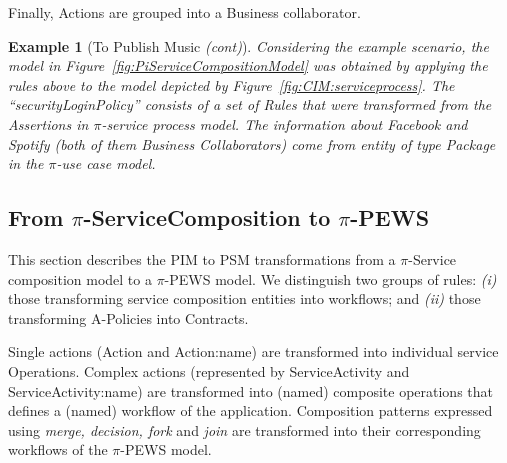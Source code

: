 \documentclass[12pt,twoside]{article}
\theoremstyle{plain}
\theoremstyle{plain}
\newtheorem{example}{Example}
\begin{document}
\begin{multicols}{2}
Finally, {\sf Actions} are grouped into  a {\sf Business collaborator}.



\begin{example}[To Publish Music \textit{(cont)}]\label{ex:toPublicMusicT5}
Considering the example scenario, the model in Figure~\ref{fig:PiServiceCompositionModel} was obtained by applying the rules above to the model depicted by Figure~\ref{fig:CIM:serviceprocess}.  
The ``securityLoginPolicy'' consists of a set of {\sf Rules} that were transformed from the {\sf Assertions} in $\pi$-service process model. 
The information about Facebook and Spotify (both of them {\sf Business
Collaborators}) come from entity of type {\sc Package} in the $\pi$-use case
model.
\end{example}

\subsection{From $\pi$-ServiceComposition to $\pi$-PEWS}

This section describes the PIM to PSM transformations from a $\pi$-Service composition mod\-el to a $\pi$-PEWS model. 
We distinguish two groups of rules: \textit{(i)} those transforming service composition entities into workflows; and \textit{(ii)} those transforming  A-Policies into Contracts.

Single actions ({\sf Action} and {\sf
Action:name}) are transformed into individual service {\sf Operations}.
Complex actions (rep\-re\-sented by {\sf ServiceActivity}  and  {\sf
ServiceActivity:name}) are transformed into (named) composite
operations that defines a (named) workflow of the application.
Composition patterns expressed using  {\em merge, decision, fork} and {\em join} are transformed into their corresponding workflows of the $\pi$-PEWS model.


\end{multicols}
\end{document}
